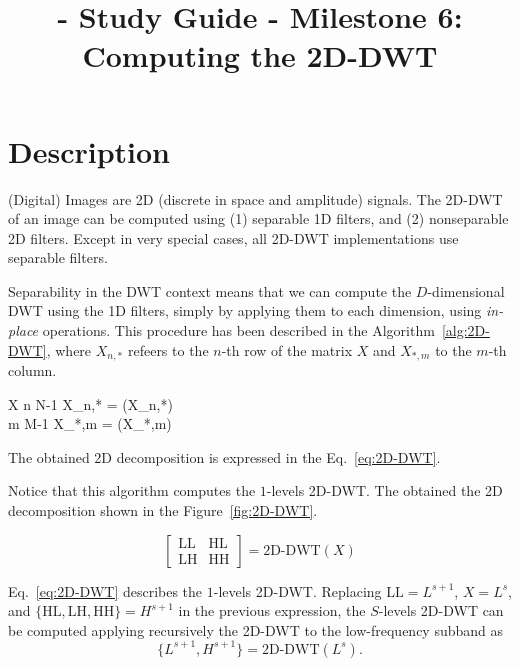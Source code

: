 
\title{\SM{} - Study Guide - Milestone 6: Computing the 2D-DWT}

\maketitle

\section{Description}

(Digital) Images are 2D (discrete in space and amplitude) signals. The
2D-DWT of an image can be computed using (1) separable 1D filters, and
(2) nonseparable 2D filters. Except in very special cases, all 2D-DWT
implementations use separable filters.

Separability in the DWT context means that we can compute the
$D$-dimensional DWT using the 1D filters, simply by applying them to
each dimension, using \emph{in-place} operations. This procedure has
been described in the Algorithm~\ref{alg:2D-DWT}, where $X_{n,*}$
refeers to the $n$-th row of the matrix $X$ and $X_{*,m}$ to the
$m$-th column.

\begin{pseudocode}{}{X}
  \label{alg:2D-DWT}
  \FOR n  \TO N-1 \DO
  X_{n,*} = (X_{n,*})
  \\
  \FOR m  \TO M-1 \DO
  X_{*,m} = (X_{*,m})
\end{pseudocode}

The obtained 2D decomposition is expressed in the Eq.~\ref{eq:2D-DWT}.

Notice that this algorithm computes the $1$-levels
2D-DWT. The obtained the 2D decomposition shown in the
Figure~\ref{fig:2D-DWT}.

\begin{equation}
  \begin{bmatrix}
    \text{LL} & \text{HL} \\
    \text{LH} & \text{HH}
  \end{bmatrix}
  =
  \text{2D-DWT}(X)
  \label{eq:2D-DWT}
\end{equation}

Eq.~\ref{eq:2D-DWT} describes the $1$-levels 2D-DWT. Replacing
$\text{LL}=L^{s+1}$, $X=L^s$, and
$\{\text{HL}, \text{LH}, \text{HH}\}=H^{s+1}$ in the previous
expression, the $S$-levels 2D-DWT can be computed applying recursively
the 2D-DWT to the low-frequency subband as
\begin{equation}
  \{L^{s+1}, H^{s+1}\} = \text{2D-DWT}(L^s).
\end{equation}

